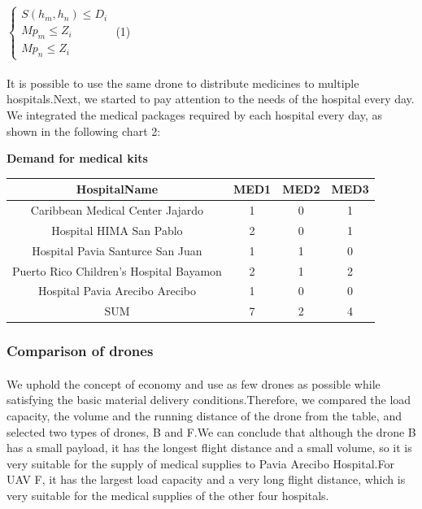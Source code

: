 \documentclass{article} %
\begin{document}
\centerline{$\left\{\begin{array}{l}{S\left(h_{m}, h_{n}\right) \leq D_{i}} \\ {M p_{m} \leq Z_{i}} \\ {M p_{n} \leq Z_{i}}\end{array}\right.$                             \qquad  \qquad  \qquad       (1)}

\paragraph{}It is possible to use the same drone to distribute medicines to multiple hospitals.Next, we started to pay attention to the needs of the hospital every day. We integrated the medical packages required by each hospital every day, as shown in the following chart 2:


\centerline{\textbf {Demand for medical kits}}
\begin{table}[h]
\begin{tabular}{cccc}
\hline
\textbf{HospitalName} & \textbf{MED1} & \textbf{MED2} & \textbf{MED3} \\ \hline
Caribbean Medical Center Jajardo         & 1         & 0       & 1        \\
Hospital HIMA San Pablo            & 2         & 0        & 1        \\
Hospital Pavia Santurce San Juan         & 1         & 1              &0                   \\ 
Puerto Rico Children's Hospital Bayamon         & 2         & 1              &2                  \\ 
Hospital Pavia Arecibo Arecibo        & 1         & 0             &0                   \\ 
SUM         & 7       & 2              &4                  \\ 
\hline
\end{tabular}
\end{table}
\subsubsection{Comparison of drones}  
\paragraph{}We uphold the concept of economy and use as few drones as possible while satisfying the basic material delivery conditions.Therefore, we compared the load capacity, the volume and the running distance of the drone from the table, and selected two types of drones, B and F.We can conclude that although the drone B has a small payload, it has the longest flight distance and a small volume, so it is very suitable for the supply of medical supplies to Pavia Arecibo Hospital.For UAV F, it has the largest load capacity and a very long flight distance, which is very suitable for the medical supplies of the other four hospitals.
\end{document}
